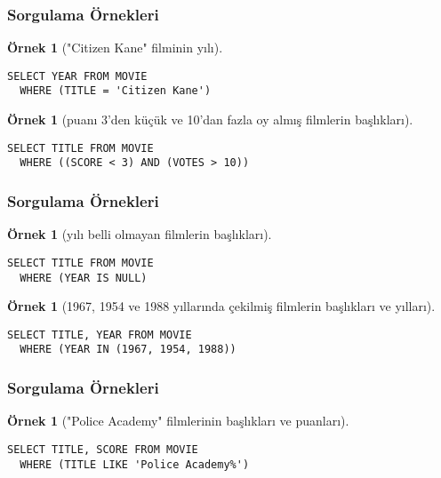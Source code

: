 \documentclass[dvipsnames]{beamer}
\theoremstyle{definition}
\theoremstyle{example}
\newtheorem{ornek}[theorem]{Örnek}
\theoremstyle{plain}
\begin{document}
\begin{frame}[fragile]
  \frametitle{Sorgulama Örnekleri}

  \begin{ornek}["Citizen Kane" filminin yılı]
    \begin{lstlisting}
SELECT YEAR FROM MOVIE
  WHERE (TITLE = 'Citizen Kane')
    \end{lstlisting}
  \end{ornek}

  \pause
  \begin{ornek}[puanı 3'den küçük ve 10'dan fazla oy almış filmlerin başlıkları]
    \begin{lstlisting}
SELECT TITLE FROM MOVIE
  WHERE ((SCORE < 3) AND (VOTES > 10))
    \end{lstlisting}
  \end{ornek}
\end{frame}

\begin{frame}[fragile]
  \frametitle{Sorgulama Örnekleri}

  \begin{ornek}[yılı belli olmayan filmlerin başlıkları]
    \begin{lstlisting}
SELECT TITLE FROM MOVIE
  WHERE (YEAR IS NULL)
    \end{lstlisting}
  \end{ornek}

  \pause
  \begin{ornek}[1967, 1954 ve 1988 yıllarında çekilmiş filmlerin başlıkları ve
                yılları]
    \begin{lstlisting}
SELECT TITLE, YEAR FROM MOVIE
  WHERE (YEAR IN (1967, 1954, 1988))
    \end{lstlisting}
  \end{ornek}
\end{frame}

\begin{frame}[fragile]
  \frametitle{Sorgulama Örnekleri}

  \begin{ornek}["Police Academy" filmlerinin başlıkları ve puanları]
    \begin{lstlisting}
SELECT TITLE, SCORE FROM MOVIE
  WHERE (TITLE LIKE 'Police Academy%')
    \end{lstlisting}
  \end{ornek}
\end{frame}
\end{document}
